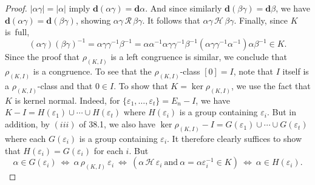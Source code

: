 \documentclass{surv-l}
\numberwithin{equation}{section}
\numberwithin{table}{section}
\numberwithin{figure}{section}
\theoremstyle{plain}
\theoremstyle{definition}
\begin{document}
\begin{proof}
$|\alpha\gamma|=|\alpha|$ imply
$\mathbf{d}(\alpha\gamma)=\mathbf{d}\alpha$. And since similarly
$\mathbf{d}(\beta\gamma)=\mathbf{d}\beta$, we have
$\mathbf{d}(\alpha\gamma)=\mathbf{d}(\beta\gamma)$, showing
$\alpha\gamma\,\mathcal{R}\,\beta\gamma$. It follows that
$\alpha\gamma\,\mathcal{H}\,\beta\gamma$. Finally, since $K$ is~full,
\[
(\alpha\gamma)(\beta\gamma)^{-1}=\alpha\gamma\gamma^{-1}\beta^{-1}
=\alpha\alpha^{-1}\alpha\gamma\gamma^{-1}\beta^{-1}
(\alpha\gamma\gamma^{-1}\alpha^{-1})\alpha\beta^{-1}\in K.
\]
Since the proof that $\rho_{(K,I)}$ is a left congruence is
similar, we conclude that $\rho_{(K,I)}$ is a congruence. To see
that the $\rho_{(K,I)}$-class $[0]=I$, note that $I$ itself is a
$\rho_{(K,I)}$-class and that $0\in I$. To show that
$K=\ker \rho_{(K,I)}$, we use the fact that $K$ is kernel
normal. Indeed, for $\{\varepsilon_{1},\ldots,
\varepsilon_{t}\}=E_{n}-I$, we have $K-I
=H(\varepsilon_{1})\cup\cdots\cup H(\varepsilon_{t})$ where
$H(\varepsilon_{i})$ is a group containing $\varepsilon_{i}$. But
in addition, by $(iii)$ of 38.1, we also have $\ker
\rho_{(K,I)}-I =G(\varepsilon_{1})\cup\cdots\cup
G(\varepsilon_{t})$ where each $G(\varepsilon_{i})$ is a group
containing $\varepsilon_{i}$. It therefore clearly suffices to
show that $H(\varepsilon_{i})=G(\varepsilon_{i})$ for each
$i$. But
\[
\alpha\in G(\varepsilon_{i})\ \Leftrightarrow\ \alpha\,\rho_{(K,I)}\,\varepsilon_{i}\ \Leftrightarrow\ (\alpha\,
\mathcal{H}\,\varepsilon_{i}\ \mathrm{and}\
\alpha=\alpha\varepsilon_{i}^{-1}\in K)\ \Leftrightarrow\ \alpha\in
H(\varepsilon_{i}).
\]


\end{proof}
\end{document}
